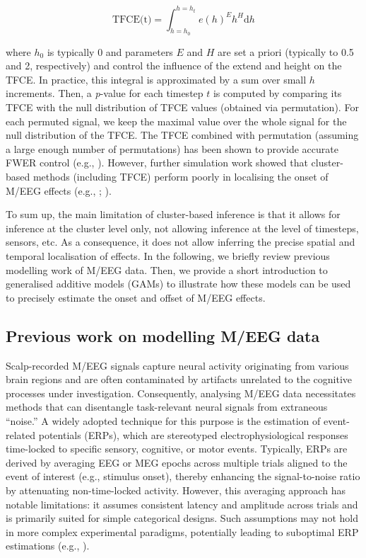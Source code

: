 \documentclass[
  doc,
  floatsintext,
  longtable,
  a4paper,
  nolmodern,
  notxfonts,
  notimes,
  colorlinks=true,linkcolor=blue,citecolor=blue,urlcolor=blue]{apa7}
\begin{document}
\[
\text{TFCE(t)} = \int_{h=h_{0}}^{h=h_{t}} e(h)^{E} h^{H} \mathrm{d}h
\]

where \(h_{0}\) is typically \(0\) and parameters \(E\) and \(H\) are
set a priori (typically to 0.5 and 2, respectively) and control the
influence of the extend and height on the TFCE. In practice, this
integral is approximated by a sum over small \(h\) increments. Then, a
\emph{p}-value for each timestep \(t\) is computed by comparing its TFCE
with the null distribution of TFCE values (obtained via permutation).
For each permuted signal, we keep the maximal value over the whole
signal for the null distribution of the TFCE. The TFCE combined with
permutation (assuming a large enough number of permutations) has been
shown to provide accurate FWER control (e.g.,
). However, further
simulation work showed that cluster-based methods (including TFCE)
perform poorly in localising the onset of M/EEG effects (e.g.,
;
).

To sum up, the main limitation of cluster-based inference is that it
allows for inference at the cluster level only, not allowing inference
at the level of timesteps, sensors, etc. As a consequence, it does not
allow inferring the precise spatial and temporal localisation of
effects. In the following, we briefly review previous modelling work of
M/EEG data. Then, we provide a short introduction to generalised
additive models (GAMs) to illustrate how these models can be used to
precisely estimate the onset and offset of M/EEG effects.

\subsection{Previous work on modelling M/EEG
data}\label{previous-work-on-modelling-meeg-data}

Scalp-recorded M/EEG signals capture neural activity originating from
various brain regions and are often contaminated by artifacts unrelated
to the cognitive processes under investigation. Consequently, analysing
M/EEG data necessitates methods that can disentangle task-relevant
neural signals from extraneous ``noise.'' A widely adopted technique for
this purpose is the estimation of event-related potentials (ERPs), which
are stereotyped electrophysiological responses time-locked to specific
sensory, cognitive, or motor events. Typically, ERPs are derived by
averaging EEG or MEG epochs across multiple trials aligned to the event
of interest (e.g., stimulus onset), thereby enhancing the
signal-to-noise ratio by attenuating non-time-locked activity. However,
this averaging approach has notable limitations: it assumes consistent
latency and amplitude across trials and is primarily suited for simple
categorical designs. Such assumptions may not hold in more complex
experimental paradigms, potentially leading to suboptimal ERP
estimations (e.g., ).
\end{document}

